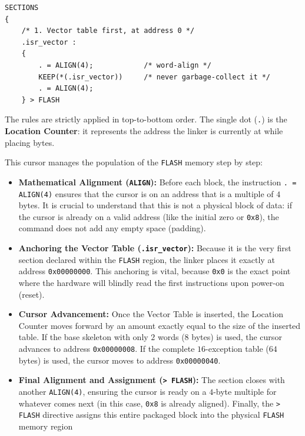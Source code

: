\begin{lstlisting}
SECTIONS
{
    /* 1. Vector table first, at address 0 */
    .isr_vector :
    {
        . = ALIGN(4);            /* word-align */
        KEEP(*(.isr_vector))     /* never garbage-collect it */
        . = ALIGN(4);
    } > FLASH

\end{lstlisting}

The rules are strictly applied in top-to-bottom order. The single dot (\texttt{.}) is the \textbf{Location Counter}: it represents the address the linker is currently at while placing bytes. 

This cursor manages the population of the \texttt{FLASH} memory step by step:

\begin{itemize}
    \item \textbf{Mathematical Alignment (\texttt{ALIGN}):} Before each block, the instruction \texttt{. = ALIGN(4)} ensures that the cursor is on an address that is a multiple of $4$ bytes. It is crucial to understand that this is not a physical block of data: if the cursor is already on a valid address (like the initial zero or \texttt{0x8}), the command does not add any empty space (padding).
    \item \textbf{Anchoring the Vector Table (\texttt{.isr\_vector}):} Because it is the very first section declared within the \texttt{FLASH} region, the linker places it exactly at address \texttt{0x00000000}. This anchoring is vital, because \texttt{0x0} is the exact point where the hardware will blindly read the first instructions upon power-on (reset).
    \item \textbf{Cursor Advancement:} Once the Vector Table is inserted, the Location Counter moves forward by an amount exactly equal to the size of the inserted table. If the base skeleton with only $2$ words ($8$ bytes) is used, the cursor advances to address \texttt{0x00000008}. If the complete $16$-exception table ($64$ bytes) is used, the cursor moves to address \texttt{0x00000040}.
    \item \textbf{Final Alignment and Assignment (\texttt{> FLASH}):} The section closes with another \texttt{ALIGN(4)}, ensuring the cursor is ready on a $4$-byte multiple for whatever comes next (in this case, \texttt{0x8} is already aligned). Finally, the \texttt{> FLASH} directive assigns this entire packaged block into the physical \texttt{FLASH} memory region\end{itemize}

